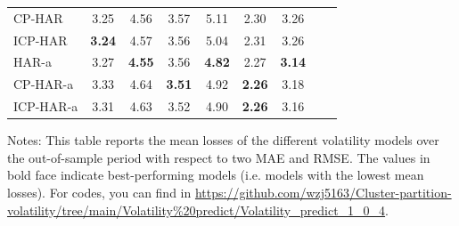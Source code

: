 \documentclass[preprint,12pt,authoryear]{elsarticle}
\begin{document}
\begin{center}
\begin{threeparttable}
\begin{tabular}{l c c c c c c c c}
CP-HAR       &  3.25  &   4.56  &   3.57  &  5.11  &   2.30  &   3.26 \\
ICP-HAR      & \textbf{3.24} & 4.57 & 3.56 & 5.04 & 2.31 & 3.26 \\
HAR-a        &  3.27  & \textbf{4.55} & 3.56 & \textbf{4.82} & 2.27 & \textbf{3.14} \\
CP-HAR-a     &  3.33  &   4.64  & \textbf{3.51} & 4.92 & \textbf{2.26} & 3.18 \\
ICP-HAR-a    &  3.31  &   4.63  &   3.52  &  4.90  & \textbf{2.26} & 3.16 \\
\bottomrule
\end{tabular}
Notes: This table reports the mean losses of the different volatility models over the out-of-sample period with respect to two MAE and RMSE. The values in bold face indicate best-performing models (i.e. models with the lowest mean losses). For codes, you can find in
\url{https://github.com/wzj5163/Cluster-partition-volatility/tree/main/Volatility\%20predict/Volatility_predict_1_0_4}.
\end{threeparttable}
\end{center}
\end{document}
